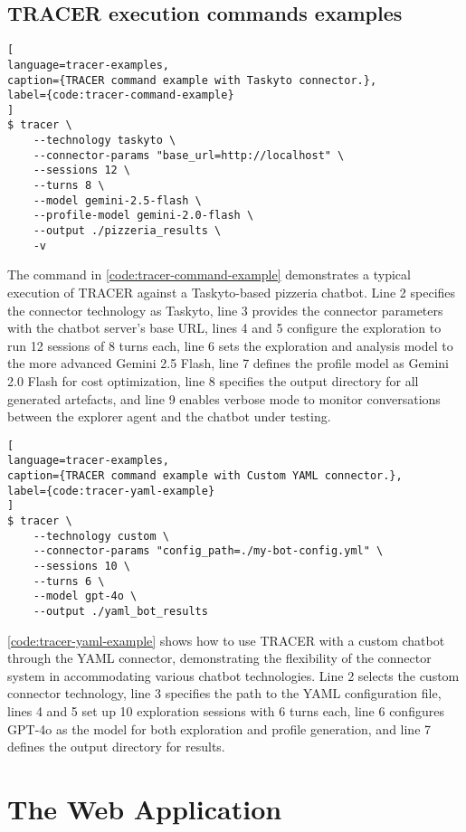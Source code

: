 \subsection{TRACER execution commands examples}

\begin{lstlisting}[
language=tracer-examples,
caption={TRACER command example with Taskyto connector.},
label={code:tracer-command-example}
]
$ tracer \
    --technology taskyto \
    --connector-params "base_url=http://localhost" \
    --sessions 12 \
    --turns 8 \
    --model gemini-2.5-flash \
    --profile-model gemini-2.0-flash \
    --output ./pizzeria_results \
    -v
\end{lstlisting}

The command in \autoref{code:tracer-command-example}
demonstrates a typical execution of \ac{TRACER} against a Taskyto-based pizzeria chatbot.
Line 2 specifies the connector technology as Taskyto,
line 3 provides the connector parameters with the chatbot server's base URL,
lines 4 and 5 configure the exploration to run 12 sessions of 8 turns each,
line 6 sets the exploration and analysis model to the more advanced Gemini 2.5 Flash,
line 7 defines the profile model as Gemini 2.0 Flash for cost optimization,
line 8 specifies the output directory for all generated artefacts,
and line 9 enables verbose mode to monitor conversations
between the explorer agent and the chatbot under testing.

\begin{lstlisting}[
language=tracer-examples,
caption={TRACER command example with Custom YAML connector.},
label={code:tracer-yaml-example}
]
$ tracer \
    --technology custom \
    --connector-params "config_path=./my-bot-config.yml" \
    --sessions 10 \
    --turns 6 \
    --model gpt-4o \
    --output ./yaml_bot_results
\end{lstlisting}

\autoref{code:tracer-yaml-example} shows how to use \ac{TRACER}
with a custom chatbot through the YAML connector,
demonstrating the flexibility of the connector system
in accommodating various chatbot technologies.
Line 2 selects the custom connector technology,
line 3 specifies the path to the YAML configuration file,
lines 4 and 5 set up 10 exploration sessions with 6 turns each,
line 6 configures GPT-4o as the model for both exploration and profile generation,
and line 7 defines the output directory for results.

\section{The Web Application}

